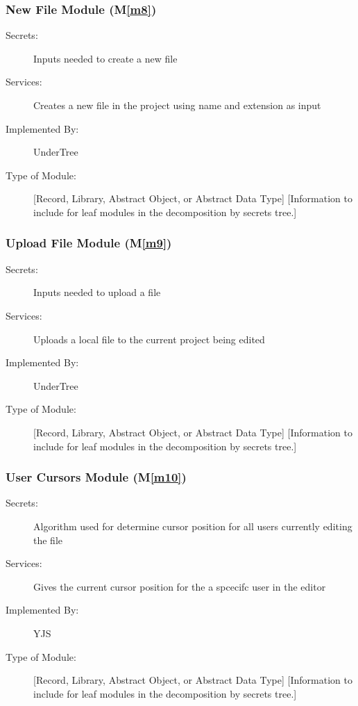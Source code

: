\documentclass[12pt, titlepage]{article}
\newcommand{\mref}[1]{M\ref{#1}}
\begin{document}
	\subsubsection{New File Module (\mref{m8})}
	
	\begin{description}
		\item[Secrets:] Inputs needed to create a new file
		\item[Services:] Creates a new file in the project using name and extension as input
		\item[Implemented By:] UnderTree
		\item[Type of Module:] [Record, Library, Abstract Object, or Abstract Data Type]
		[Information to include for leaf modules in the decomposition by secrets tree.]
	\end{description}
	
	\subsubsection{Upload File Module (\mref{m9})}
	
	\begin{description}
		\item[Secrets:] Inputs needed to upload a file
		\item[Services:] Uploads a local file to the current project being edited
		\item[Implemented By:] UnderTree
		\item[Type of Module:] [Record, Library, Abstract Object, or Abstract Data Type]
		[Information to include for leaf modules in the decomposition by secrets tree.]
	\end{description}
	
	\subsubsection{User Cursors Module (\mref{m10})}
	
	\begin{description}
		\item[Secrets:] Algorithm used for determine cursor position for all users currently editing the file
		\item[Services:] Gives the current cursor position for the a spcecifc user in the editor
		\item[Implemented By:] YJS
		\item[Type of Module:] [Record, Library, Abstract Object, or Abstract Data Type]
		[Information to include for leaf modules in the decomposition by secrets tree.]
	\end{description}
	
\end{document}
